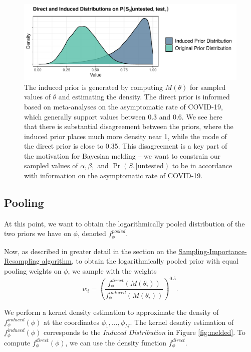 \documentclass[12pt,twoside]{smiththesis}
\begin{document}
\begin{figure}

{\centering \includegraphics[width=1\linewidth]{figure/induced-direct} 

}

\caption{\label{fig:prior-induced}The induced prior is generated by computing $M(\theta)$ for sampled values of $\theta$ and estimating the density. The direct prior is informed based on meta-analyses on the asymptomatic rate of COVID-19, which generally support values between 0.3 and 0.6. We see here that there is substantial disagreement between the priors, where the induced prior places much more density near 1, while the mode of the direct prior is close to 0.35. This disagreement is a key part of the motivation for Bayesian melding -- we want to constrain our sampled values of $\alpha,\beta,$ and $\Pr(S_1|\text{untested})$ to be in accordance with information on the asymptomatic rate of COVID-19.}\label{fig:unnamed-chunk-18}
\end{figure}
\hypertarget{pooling}{%
\subsection{Pooling}\label{pooling}}

At this point, we want to obtain the logarithmically pooled distribution of the two priors we have on \(\phi\), denoted \(f_\phi^{pooled}\).

Now, as described in greater detail in the section on the \protect\hyperlink{logpooled}{Sampling-Importance-Resampling algorithm}, to obtain the logarithmically pooled prior with equal pooling weights on \(\phi\), we sample with the weights \[w_i = \left( \frac{f_\phi^{direct}(M(\theta_i))}{f_\phi^{induced}(M(\theta_i))} \right)^{0.5}. \tag{1}\]

We perform a kernel density estimation to approximate the density of \(f_\phi^{induced}(\phi)\) at the coordinates \(\phi_1, \dots, \phi_M\). The kernel desntiy estimation of \(f_\phi^{induced}(\phi)\) corresponds to the \emph{Induced Distribution} in Figure \ref{fig:melded}. To compute \(f_\phi^{direct}(\phi)\), we can use the density function \(f_\phi^{direct}\).
\end{document}
